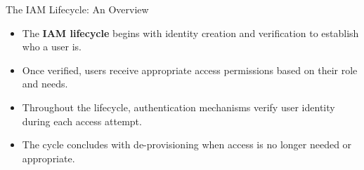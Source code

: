 \documentclass{beamer}
\begin{document}
\begin{frame}{The IAM Lifecycle: An Overview}
    \begin{itemize}
        \item The \textbf{IAM lifecycle} begins with identity creation and verification to establish who a user is.
        \item Once verified, users receive appropriate access permissions based on their role and needs.
        \item Throughout the lifecycle, authentication mechanisms verify user identity during each access attempt.
        \item The cycle concludes with de-provisioning when access is no longer needed or appropriate.
    \end{itemize}
    
    \begin{center}
    \end{center}
\end{frame}
\end{document}
